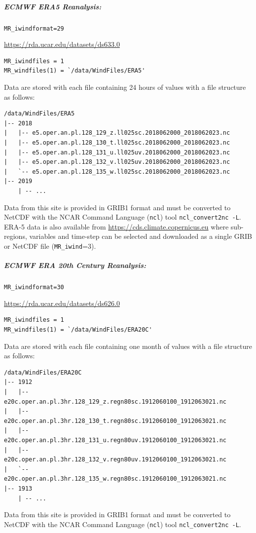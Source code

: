\documentclass[11pt]{article}   %
\begin{document}
\subparagraph{ECMWF ERA5 Reanalysis:}
\texttt{MR\_iwindformat=29}

\url{https://rda.ucar.edu/datasets/ds633.0}
\begin{verbatim}
MR_iwindfiles = 1
MR_windfiles(1) = `/data/WindFiles/ERA5'
\end{verbatim}
Data are stored with each file containing 24 hours of values with a file structure as follows:
\begin{verbatim}
/data/WindFiles/ERA5
|-- 2018
|   |-- e5.oper.an.pl.128_129_z.ll025sc.2018062000_2018062023.nc
|   |-- e5.oper.an.pl.128_130_t.ll025sc.2018062000_2018062023.nc
|   |-- e5.oper.an.pl.128_131_u.ll025uv.2018062000_2018062023.nc
|   |-- e5.oper.an.pl.128_132_v.ll025uv.2018062000_2018062023.nc
|   `-- e5.oper.an.pl.128_135_w.ll025sc.2018062000_2018062023.nc
|-- 2019
    | -- ...
\end{verbatim}
Data from this site is provided in GRIB1 format and must be converted to NetCDF
with the NCAR Command Language (\texttt{ncl}) tool \texttt{ncl\_convert2nc -L}.
ERA-5 data is also available from \url{https://cds.climate.copernicus.eu} where
sub-regions, variables and time-step can be selected and  downloaded as a
single GRIB or NetCDF file (\texttt{MR\_iwind}=3).

\subparagraph{ECMWF ERA 20th Century Reanalysis:}
\texttt{MR\_iwindformat=30}

\url{https://rda.ucar.edu/datasets/ds626.0}
\begin{verbatim}
MR_iwindfiles = 1
MR_windfiles(1) = `/data/WindFiles/ERA20C'
\end{verbatim}
Data are stored with each file containing one month of values with a file structure as follows:
\begin{verbatim}
/data/WindFiles/ERA20C
|-- 1912
|   |-- e20c.oper.an.pl.3hr.128_129_z.regn80sc.1912060100_1912063021.nc
|   |-- e20c.oper.an.pl.3hr.128_130_t.regn80sc.1912060100_1912063021.nc
|   |-- e20c.oper.an.pl.3hr.128_131_u.regn80uv.1912060100_1912063021.nc
|   |-- e20c.oper.an.pl.3hr.128_132_v.regn80uv.1912060100_1912063021.nc
|   `-- e20c.oper.an.pl.3hr.128_135_w.regn80sc.1912060100_1912063021.nc
|-- 1913
    | -- ...
\end{verbatim}
Data from this site is provided in GRIB1 format and must be converted to NetCDF
with the NCAR Command Language (\texttt{ncl}) tool \texttt{ncl\_convert2nc -L}.
\end{document}
